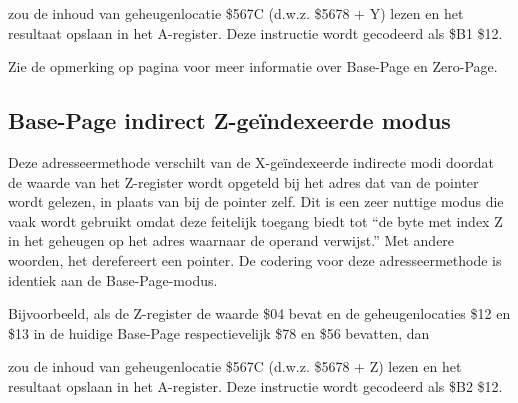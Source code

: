 zou de inhoud van geheugenlocatie \$567C (d.w.z. \$5678 + Y) lezen en het resultaat opslaan in het A-register. Deze instructie wordt gecodeerd als \$B1 \$12.

Zie de opmerking op pagina \pageref{Base-Page (Zero-Page) Mode} voor meer informatie over Base-Page en Zero-Page.

\subsection{Base-Page indirect Z-geïndexeerde modus}

Deze adresseermethode verschilt van de X-geïndexeerde indirecte modi doordat de waarde van het Z-register wordt opgeteld bij het adres dat van de pointer wordt gelezen, in plaats van bij de pointer zelf. Dit is een zeer nuttige modus die vaak wordt gebruikt omdat deze feitelijk toegang biedt tot ``de byte met index Z in het geheugen op het adres waarnaar de operand verwijst.'' Met andere woorden, het derefereert een pointer. De codering voor deze adresseermethode is identiek aan de Base-Page-modus.

Bijvoorbeeld, als de Z-register de waarde \$04 bevat en de geheugenlocaties \$12 en \$13 in de huidige Base-Page respectievelijk \$78 en \$56 bevatten, dan


zou de inhoud van geheugenlocatie \$567C (d.w.z. \$5678 + Z) lezen en het resultaat opslaan in het A-register. Deze instructie wordt gecodeerd als \$B2 \$12.

